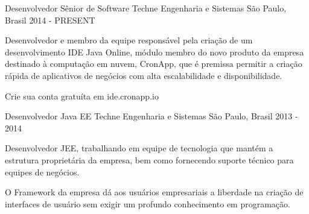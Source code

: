 

\begin{cventries}

  \cventry
    {Desenvolvedor Sênior de Software} %
    {Techne Engenharia e Sistemas} %
    {São Paulo, Brasil} %
    {2014 - PRESENT} %
    {
      \begin{cvitems} %
        \item {Desenvolvedor e membro da equipe responsável pela criação de um desenvolvimento IDE Java Online, módulo membro do novo produto da empresa destinado à computação em nuvem, CronApp, que é premissa permitir a criação rápida de aplicativos de negócios com alta escalabilidade e disponibilidade.}
        \item {Crie sua conta gratuíta em ide.cronapp.io}
      \end{cvitems}
    }

  \cventry
    {Desenvolvedor Java EE} %
    {Techne Engenharia e Sistemas} %
    {São Paulo, Brasil} %
    {2013 - 2014} %
    {
      \begin{cvitems} %
        \item {Desenvolvedor JEE, trabalhando em equipe de tecnologia que mantém a estrutura proprietária da empresa, bem como fornecendo suporte técnico para equipes de negócios.}
        \item {O Framework da empresa dá aos usuários empresariais a liberdade na criação de interfaces de usuário sem exigir um profundo conhecimento em programação.}
      \end{cvitems}
    }


\end{cventries}
